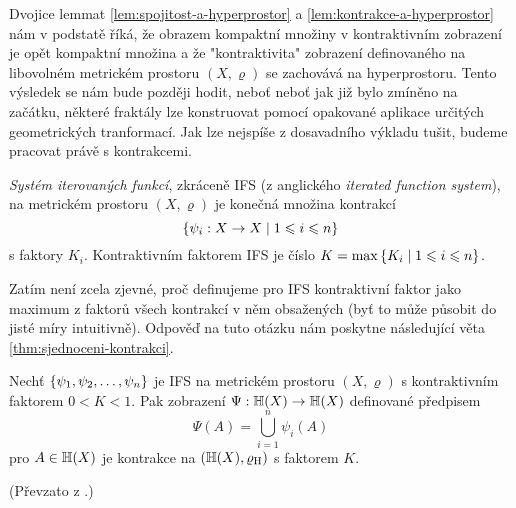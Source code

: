 Dvojice lemmat \ref{lem:spojitost-a-hyperprostor} a \ref{lem:kontrakce-a-hyperprostor} nám v podstatě říká, že obrazem kompaktní množiny v kontraktivním zobrazení je opět kompaktní množina a že "kontraktivita" zobrazení definovaného na libovolném metrickém prostoru $(X,\varrho)$ se zachovává na hyperprostoru. Tento výsledek se nám bude později hodit, neboť neboť jak již bylo zmíněno na začátku, některé fraktály lze konstruovat pomocí opakované aplikace určitých geometrických tranformací. Jak lze nejspíše z dosavadního výkladu tušit, budeme pracovat právě s kontrakcemi.
\begin{definition}\label{def:system-iterovanych-funkci}
    \emph{Systém iterovaných funkcí}, zkráceně IFS (z anglického \emph{iterated function system}), na metrickém prostoru $(X,\varrho)$ je konečná množina kontrakcí
    \[\left\{\psi_i:X \rightarrow X\mid 1\leqslant i\leqslant n\right\}\]
    s faktory $K_i$. Kontraktivním faktorem IFS je číslo $K=\max\left\{K_i\mid 1\leqslant i\leqslant n\right\}$.
\end{definition}
Zatím není zcela zjevné, proč definujeme pro IFS kontraktivní faktor jako maximum z faktorů všech kontrakcí v něm obsažených (byť to může působit do jisté míry intuitivně). Odpověď na tuto otázku nám poskytne následující věta \ref{thm:sjednoceni-kontrakci}.
\begin{theorem}\label{thm:sjednoceni-kontrakci}
    Nechť $\left\{\psi_1,\psi_2,\ldots,\psi_n\right\}$ je IFS na metrickém prostoru $(X,\varrho)$ s kontraktivním faktorem $0<K<1$. Pak zobrazení $\Psi:\mathbb{H}(X) \rightarrow \mathbb{H}(X)$ definované předpisem
    \[\Psi(A)=\bigcup_{i=1}^n\psi_i(A)\]
    pro $A\in\mathbb{H}(X)$ je kontrakce na $(\mathbb{H}(X),\varrho_\textup{H})$ s faktorem $K$.
\end{theorem}
(Převzato z \citep[str. 81]{Barnsley1993}.)
